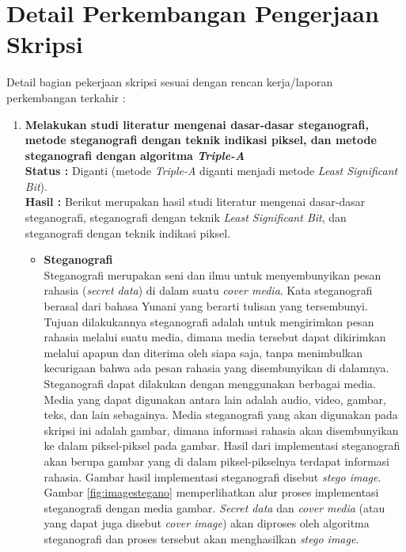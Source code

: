 \documentclass[a4paper,twoside]{article}
\begin{document}
\section{Detail Perkembangan Pengerjaan Skripsi}
Detail bagian pekerjaan skripsi sesuai dengan rencan kerja/laporan perkembangan terkahir :
	\begin{enumerate}
		\item \textbf{Melakukan studi literatur mengenai dasar-dasar steganografi, metode steganografi dengan teknik indikasi piksel, dan metode steganografi dengan algoritma \textit{Triple-A}}\\
		{\bf Status :} Diganti (metode \textit{Triple-A} diganti menjadi metode \textit{Least Significant Bit}).\\
		{\bf Hasil :} Berikut merupakan hasil studi literatur mengenai dasar-dasar steganografi, steganografi dengan teknik \textit{Least Significant Bit}, dan steganografi dengan teknik indikasi piksel. 
		
		\begin{itemize}
		\item \textbf{Steganografi}\\
		Steganografi merupakan seni dan ilmu untuk menyembunyikan pesan rahasia (\textit{secret data}) di dalam suatu \textit{cover media}. Kata steganografi berasal dari bahasa Yunani yang berarti tulisan yang tersembunyi. Tujuan dilakukannya steganografi adalah untuk mengirimkan pesan rahasia melalui suatu media, dimana media tersebut dapat dikirimkan melalui apapun dan diterima oleh siapa saja, tanpa menimbulkan kecurigaan bahwa ada pesan rahasia yang disembunyikan di dalamnya.\\
		
		Steganografi dapat dilakukan dengan menggunakan berbagai media. Media yang dapat digunakan antara lain adalah audio, video, gambar, teks, dan lain sebagainya. Media steganografi yang akan digunakan pada skripsi ini adalah gambar, dimana informasi rahasia akan disembunyikan ke dalam piksel-piksel pada gambar. Hasil dari implementasi steganografi akan berupa gambar yang di dalam piksel-pikselnya terdapat informasi rahasia. Gambar hasil implementasi steganografi disebut \textit{stego image}. Gambar \ref{fig:imagestegano} memperlihatkan alur proses implementasi steganografi dengan media gambar. \textit{Secret data} dan \textit{cover media} (atau yang dapat juga disebut \textit{cover image}) akan diproses oleh algoritma steganografi dan proses tersebut akan menghasilkan \textit{stego image}.\\
		

\end{itemize}
\end{enumerate}
\end{document}
